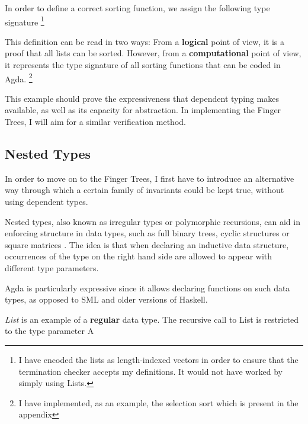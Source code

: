 \documentclass[12pt,twoside,notitlepage]{report}
\newcommand{\Conid}[1]{\mathit{#1}}
\newcommand{\Varid}[1]{\mathit{#1}}
\def\resethooks{%
  \global\let\SaveRestoreHook\empty
  \global\let\ColumnHook\empty}
\let\hspre\empty
\let\hspost\empty
\begin{document}
In order to define a correct sorting function, we assign the following type signature \footnote{I have encoded the lists as length-indexed vectors in order to ensure that the termination checker accepts my definitions. It would not have worked by simply using Lists.}

\resethooks

This definition can be read in two ways: From a \textbf{logical} point of view, it is a proof that all lists can be sorted. However, from a \textbf{computational} point of view, it represents the type signature of all sorting functions that can be coded in Agda. \footnote{I have implemented, as an example, the selection sort which is present in the appendix}

This example should prove the expressiveness that dependent typing makes available, as well as its capacity for abstraction. In implementing the Finger Trees, I will aim for a similar verification method.

\subsection{Nested Types}

In order to move on to the Finger Trees, I first have to introduce an alternative way through which a certain family of invariants could be kept true, without using dependent types. 

Nested types\cite{nested_types}, also known as irregular types or polymorphic recursions, can aid in enforcing structure in data types, such as full binary trees, cyclic structures \cite{cyclic} or square matrices \cite{okasaki_matrix}. The idea is that when declaring an inductive data structure, occurrences of the type on the right hand side are allowed to appear with different type parameters.

Agda is particularly expressive since it allows declaring functions on such data types, as opposed to SML and older versions of Haskell.

\textit{List} is an example of a \textbf{regular} data type. The recursive call to List is restricted to the type parameter A
\end{document}

